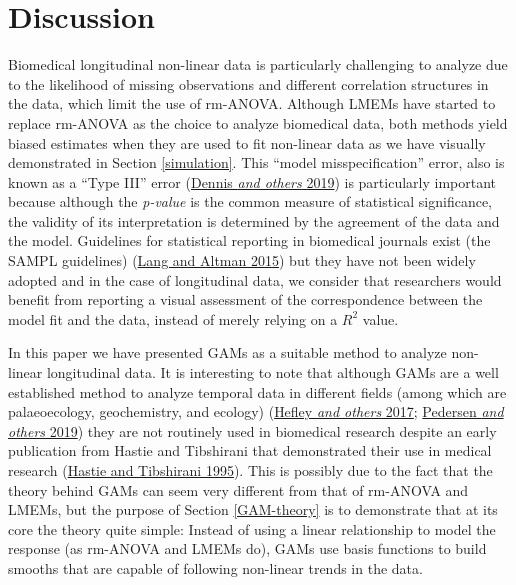\documentclass[
]{article}
\begin{document}
\hypertarget{discussion}{%
\section{Discussion}\label{discussion}}

Biomedical longitudinal non-linear data is particularly challenging to analyze due to the likelihood of missing observations and different correlation structures in the data, which limit the use of rm-ANOVA. Although LMEMs have started to replace rm-ANOVA as the choice to analyze biomedical data, both methods yield biased estimates when they are used to fit non-linear data as we have visually demonstrated in Section \ref{simulation}. This ``model misspecification'' error, also is known as a ``Type III'' error (\protect\hyperlink{ref-dennis2019}{Dennis \emph{and others} 2019}) is particularly important because although the \emph{p-value} is the common measure of statistical significance, the validity of its interpretation is determined by the agreement of the data and the model. Guidelines for statistical reporting in biomedical journals exist (the SAMPL guidelines) (\protect\hyperlink{ref-lang2015}{Lang and Altman 2015}) but they have not been widely adopted and in the case of longitudinal data, we consider that researchers would benefit from reporting a visual assessment of the correspondence between the model fit and the data, instead of merely relying on a \(R^2\) value.

In this paper we have presented GAMs as a suitable method to analyze non-linear longitudinal data. It is interesting to note that although GAMs are a well established method to analyze temporal data in different fields (among which are palaeoecology, geochemistry, and ecology) (\protect\hyperlink{ref-hefley2017}{Hefley \emph{and others} 2017}; \protect\hyperlink{ref-pedersen2019}{Pedersen \emph{and others} 2019}) they are not routinely used in biomedical research despite an early publication from Hastie and Tibshirani that demonstrated their use in medical research (\protect\hyperlink{ref-hastie1995}{Hastie and Tibshirani 1995}). This is possibly due to the fact that the theory behind GAMs can seem very different from that of rm-ANOVA and LMEMs, but the purpose of Section \ref{GAM-theory} is to demonstrate that at its core the theory quite simple: Instead of using a linear relationship to model the response (as rm-ANOVA and LMEMs do), GAMs use basis functions to build smooths that are capable of following non-linear trends in the data.
\end{document}
